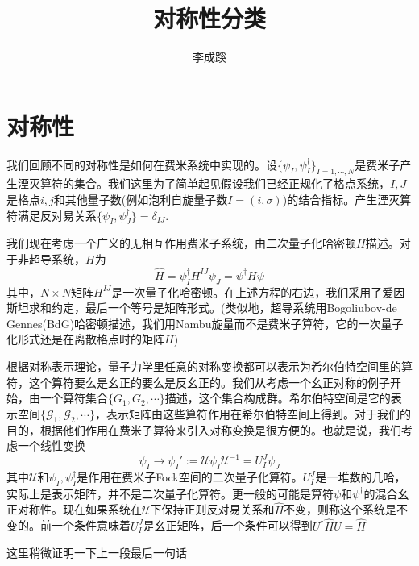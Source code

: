 \documentclass[a4paper]{article}
\numberwithin{equation}{subsection}
\begin{document}
\title{对称性分类}
\author{李成蹊}
\maketitle
\tableofcontents
\newpage
\section{对称性}
我们回顾不同的对称性是如何在费米系统中实现的。设$\{\psi_{I},\psi_I^\dagger\}_{I=1,\cdots,N}$是费米子产生湮灭算符的集合。我们这里为了简单起见假设我们已经正规化了格点系统，$I,J$是格点$i,j$和其他量子数(例如泡利自旋量子数$I=(i,\sigma)$)的结合指标。产生湮灭算符满足反对易关系$\{\psi_I,\psi_J^\dagger\}=\delta_{IJ}$.

我们现在考虑一个广义的无相互作用费米子系统，由二次量子化哈密顿$H$描述。对于非超导系统，$H$为
\begin{equation}
    \hat{H}=\psi_I^\dagger H^{IJ}\psi_J=\psi^\dagger H\psi
\end{equation}
其中，$N\times N$矩阵$H^{IJ}$是一次量子化哈密顿。在上述方程的右边，我们采用了爱因斯坦求和约定，最后一个等号是矩阵形式。(类似地，超导系统用Bogoliubov-de Gennes(BdG)哈密顿描述，我们用Nambu旋量而不是费米子算符，它的一次量子化形式还是在离散格点时的矩阵$H$)

根据对称表示理论，量子力学里任意的对称变换都可以表示为希尔伯特空间里的算符，这个算符要么是幺正的要么是反幺正的。我们从考虑一个幺正对称的例子开始，由一个算符集合$\{G_1,G_2,\cdots\}$描述，这个集合构成群。希尔伯特空间是它的表示空间$\{\mathcal{G}_1,\mathcal{G}_2,\cdots\}$，表示矩阵由这些算符作用在希尔伯特空间上得到。对于我们的目的，根据他们作用在费米子算符来引入对称变换是很方便的。也就是说，我们考虑一个线性变换
\begin{equation}
    \psi_I\rightarrow\psi_I':=\mathcal{U}\psi_I\mathcal{U}^{-1}=U_{I}^{J}\psi_J
\end{equation}
其中$\mathcal{U}$和$\psi_I,\psi_I^\dagger$是作用在费米子Fock空间的二次量子化算符。$U_I^J$是一堆数的几哈，实际上是表示矩阵，并不是二次量子化算符。更一般的可能是算符$\psi$和$\psi^\dagger$的混合幺正对称性。现在如果系统在$\mathcal{U}$下保持正则反对易关系和$\hat{H}$不变，则称这个系统是不变的。前一个条件意味着$U_I^J$是幺正矩阵，后一个条件可以得到$U^\dagger \hat{H}U=\hat{H}$

这里稍微证明一下上一段最后一句话
\end{document}
